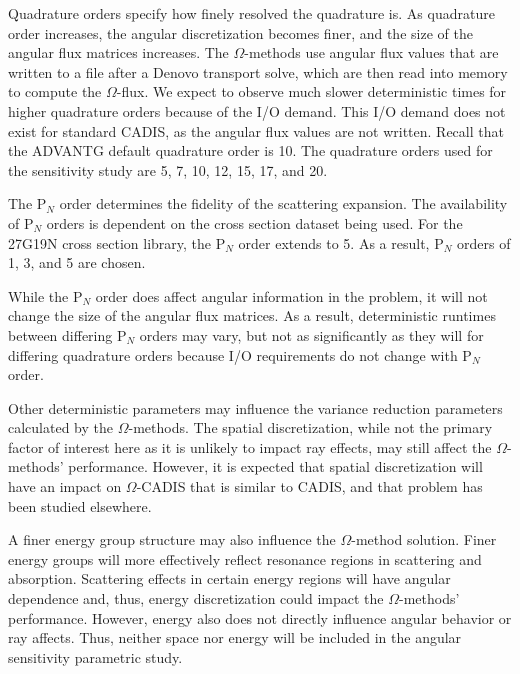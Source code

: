 Quadrature orders specify
how finely resolved the quadrature is. As quadrature order
increases, the angular discretization becomes finer, and the
size of the angular flux matrices increases. The $\Omega$-methods use angular
flux values that are written to a file after a Denovo transport solve, which are
then read into memory to compute the $\Omega$-flux. We expect to
observe much slower deterministic times  for higher quadrature orders
because of the I/O demand. This I/O
demand does not exist for standard CADIS, as the angular flux values are
not written.
Recall that the ADVANTG
default quadrature order is 10. The quadrature orders used for the sensitivity
study are 5, 7, 10, 12, 15, 17, and 20.

The P$_N$ order determines the fidelity of the scattering expansion. The
availability of P$_N$ orders is dependent on the cross section dataset being used. For the
27G19N cross section library, the P$_N$ order extends to 5. As a result,
P$_N$ orders of 1, 3, and 5 are chosen.

While the P$_N$ order
does affect angular information in the problem, it will not change the size of
the angular flux matrices. As a result, deterministic runtimes between
differing P$_N$ orders
may vary, but not as significantly as they will for differing quadrature orders
because I/O requirements do not change with P$_N$ order.

Other deterministic parameters may influence the variance reduction parameters
calculated by the $\Omega$-methods.
The spatial discretization, while not the primary factor of interest here as it is unlikely to impact ray effects, 
may still affect the $\Omega$-methods' performance.
However, it is expected that spatial discretization will have an impact on $\Omega$-CADIS that is similar to CADIS,
and that problem has been studied elsewhere.

A finer energy group structure may also influence the $\Omega$-method solution.
Finer energy groups will more effectively reflect resonance regions in
scattering and absorption. Scattering effects in certain energy regions will
have angular dependence and, thus, energy discretization could impact the $\Omega$-methods' performance. 
However, energy also does
not directly influence angular behavior or ray affects. Thus, neither space nor energy will be included
in the angular sensitivity parametric study.


